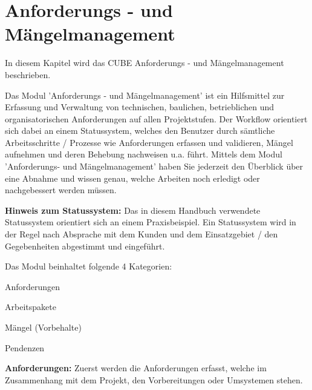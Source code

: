 
\clearpage

\section{Anforderungs - und Mängelmanagement}
\label{bkm:Ref2018071701}

In diesem Kapitel wird das CUBE Anforderungs - und Mängelmanagement beschrieben.

\vspace{\baselineskip}

Das Modul 'Anforderungs - und Mängelmanagement' ist ein Hilfsmittel zur Erfassung und Verwaltung von technischen, baulichen, betrieblichen und organisatorischen Anforderungen auf allen Projektstufen. Der Workflow orientiert sich dabei an einem Statussystem, welches den Benutzer durch sämtliche Arbeitsschritte / Prozesse wie Anforderungen erfassen und validieren, Mängel aufnehmen und deren Behebung nachweisen u.a. führt. Mittels dem Modul 'Anforderungs- und Mängelmanagement' haben Sie jederzeit den Überblick über eine Abnahme und wissen genau, welche Arbeiten noch erledigt oder nachgebessert werden müssen.

\vspace{\baselineskip}

\textbf{Hinweis zum Statussystem:} Das in diesem Handbuch verwendete Statussystem orientiert sich an einem Praxisbeispiel. Ein Statussystem wird in der Regel nach Absprache mit dem Kunden und dem Einsatzgebiet / den Gegebenheiten abgestimmt und eingeführt.

\vspace{\baselineskip}

Das Modul beinhaltet folgende 4 Kategorien:

\vspace{\baselineskip}

\begin{compactitem}
	\item Anforderungen
	\item Arbeitspakete
	\item Mängel (Vorbehalte)
	\item Pendenzen
\end{compactitem}

\vspace{\baselineskip}

\textbf{Anforderungen:} Zuerst werden die Anforderungen erfasst, welche im Zusammenhang mit dem Projekt, den Vorbereitungen oder Umsystemen stehen. \\

